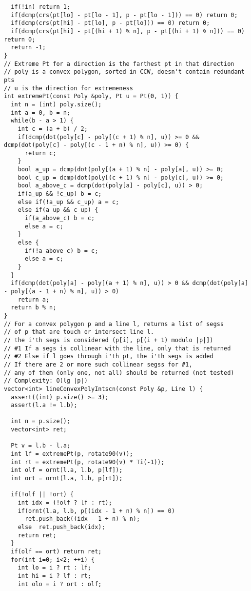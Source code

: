 \documentclass[FSZ,a4paper,onesided]{article}
\begin{document}
\begin{multicols*}{\COLS}
\begin{lstlisting}
  if(!in) return 1;
  if(dcmp(crs(pt[lo] - pt[lo - 1], p - pt[lo - 1])) == 0) return 0;
  if(dcmp(crs(pt[hi] - pt[lo], p - pt[lo])) == 0) return 0;
  if(dcmp(crs(pt[hi] - pt[(hi + 1) % n], p - pt[(hi + 1) % n])) == 0) return 0;
  return -1;
}
// Extreme Pt for a direction is the farthest pt in that direction
// poly is a convex polygon, sorted in CCW, doesn't contain redundant pts
// u is the direction for extremeness
int extremePt(const Poly &poly, Pt u = Pt(0, 1)) {
  int n = (int) poly.size();
  int a = 0, b = n;
  while(b - a > 1) {
    int c = (a + b) / 2;
    if(dcmp(dot(poly[c] - poly[(c + 1) % n], u)) >= 0 && dcmp(dot(poly[c] - poly[(c - 1 + n) % n], u)) >= 0) {
      return c;
    }
    bool a_up = dcmp(dot(poly[(a + 1) % n] - poly[a], u)) >= 0;
    bool c_up = dcmp(dot(poly[(c + 1) % n] - poly[c], u)) >= 0;
    bool a_above_c = dcmp(dot(poly[a] - poly[c], u)) > 0;
    if(a_up && !c_up) b = c;
    else if(!a_up && c_up) a = c;
    else if(a_up && c_up) {
      if(a_above_c) b = c;
      else a = c;
    }
    else {
      if(!a_above_c) b = c;
      else a = c;
    }
  }
  if(dcmp(dot(poly[a] - poly[(a + 1) % n], u)) > 0 && dcmp(dot(poly[a] - poly[(a - 1 + n) % n], u)) > 0)
    return a;
  return b % n;
}
// For a convex polygon p and a line l, returns a list of segss
// of p that are touch or intersect line l.
// the i'th segs is considered (p[i], p[(i + 1) modulo |p|])
// #1 If a segs is collinear with the line, only that is returned
// #2 Else if l goes through i'th pt, the i'th segs is added
// If there are 2 or more such collinear segss for #1,
// any of them (only one, not all) should be returned (not tested)
// Complexity: O(lg |p|)
vector<int> lineConvexPolyIntscn(const Poly &p, Line l) {
  assert((int) p.size() >= 3);
  assert(l.a != l.b);

  int n = p.size();
  vector<int> ret;

  Pt v = l.b - l.a;
  int lf = extremePt(p, rotate90(v));
  int rt = extremePt(p, rotate90(v) * Ti(-1));
  int olf = ornt(l.a, l.b, p[lf]);
  int ort = ornt(l.a, l.b, p[rt]);

  if(!olf || !ort) {
    int idx = (!olf ? lf : rt);
    if(ornt(l.a, l.b, p[(idx - 1 + n) % n]) == 0)
      ret.push_back((idx - 1 + n) % n);
    else  ret.push_back(idx);
    return ret;
  }
  if(olf == ort) return ret;
  for(int i=0; i<2; ++i) {
    int lo = i ? rt : lf;
    int hi = i ? lf : rt;
    int olo = i ? ort : olf;


\end{lstlisting}
\end{multicols*}
\end{document}

